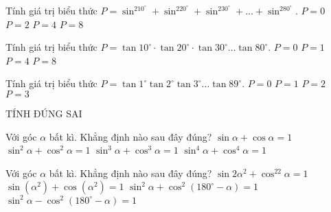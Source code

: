 \begin{ex}%
Tính giá trị biểu thức $P=\sin ^210^{\circ}+\sin ^220^{\circ}+\sin ^230^{\circ}+ \ldots +\sin ^280^{\circ}.$
\choice
{$P=0$}
{$P=2$}
{\True $P=4$}
{$P=8$}
\end{ex}

\begin{ex}%
Tính giá trị biểu thức $P=\tan 10^\circ\cdot\tan 20^\circ\cdot\tan 30^\circ \ldots \tan 80^\circ.$
\choice
{$P=0$}
{\True $P=1$}
{$P=4$}
{$P=8$}
\end{ex}

\begin{ex}%
Tính giá trị biểu thức $P=\tan 1^{\circ}\tan 2^{\circ}\tan 3^{\circ} \ldots \tan 89^{\circ}.$ 
\choice
{$P=0$}
{\True $P=1$}
{$P=2$}
{$P=3$}
 \end{ex}

\begin{dang}
    { TÍNH ĐÚNG SAI}
\end{dang}

\begin{ex}%
Với góc $\alpha $ bất kì. Khẳng định nào sau đây đúng?
\choice
{$\sin \alpha+\cos \alpha =1$}
{\True $\sin ^2\alpha+\cos ^2\alpha =1$}
{$\sin ^3\alpha+\cos ^3\alpha =1$}
{$\sin ^4\alpha+\cos ^4\alpha =1$}
\loigiai{
 } 
\end{ex}

\begin{ex}%
Với góc $\alpha $ bất kì. Khẳng định nào sau đây đúng?
\choice
{$\sin 2\alpha ^2+\cos ^22\alpha =1$}
{$\sin \left({\alpha ^2}\right)+\cos \left({\alpha ^2}\right)=1$}
{\True $\sin ^2\alpha+\cos ^2\left({180^\circ-\alpha}\right)=1$}
{$\sin ^2\alpha-\cos ^2\left({180^\circ-\alpha}\right)=1$}
\end{ex}

